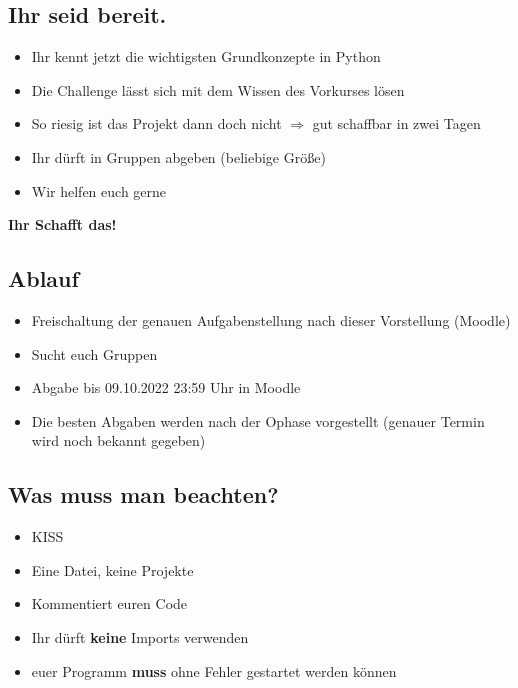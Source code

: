 \subsection{Ihr seid bereit.}
\begin{frame}
    \slidehead
    \begin{itemize}
        \item Ihr kennt jetzt die wichtigsten Grundkonzepte in Python
        \item Die Challenge lässt sich mit dem Wissen des Vorkurses lösen
        \item So riesig ist das Projekt dann doch nicht $\Rightarrow$ gut schaffbar in zwei Tagen
        \item Ihr dürft in Gruppen abgeben (beliebige Größe)
        \item Wir helfen euch gerne
    \end{itemize}
    \pause
    \vspace{\fill}
    \begin{center}
        \textbf{\huge Ihr Schafft das!}
    \end{center}
    \vspace{\fill}
\end{frame}

\subsection{Ablauf}
\begin{frame}
    \slidehead
    \begin{itemize}
        \item Freischaltung der genauen Aufgabenstellung nach dieser Vorstellung (Moodle)
        \item Sucht euch Gruppen
        \item Abgabe bis 09.10.2022 23:59 Uhr in Moodle
        \item Die besten Abgaben werden nach der Ophase vorgestellt (genauer Termin wird noch bekannt gegeben)
    \end{itemize}
\end{frame}

\subsection{Was muss man beachten?}
\begin{frame}
    \slidehead
    \begin{itemize}
        \item KISS
        \item Eine Datei, keine Projekte
        \item Kommentiert euren Code
        \item Ihr dürft \textbf{keine} Imports verwenden
        \item euer Programm \textbf{muss} ohne Fehler gestartet werden können
    \end{itemize}
\end{frame}

